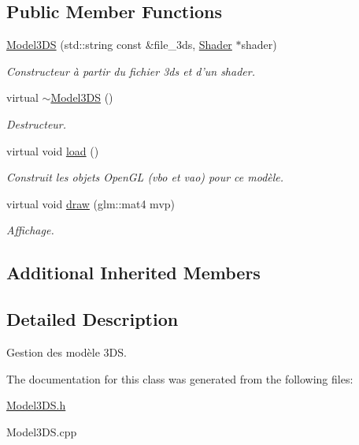 \subsection*{Public Member Functions}
\begin{DoxyCompactItemize}
\item 
\hypertarget{classModel3DS_ad40489eb8948fbc5e838333763ed8729}{\hyperlink{classModel3DS_ad40489eb8948fbc5e838333763ed8729}{Model3\+D\+S} (std\+::string const \&file\+\_\+3ds, \hyperlink{classShader}{Shader} $\ast$shader)}\label{classModel3DS_ad40489eb8948fbc5e838333763ed8729}

\begin{DoxyCompactList}\small\item\em Constructeur à partir du fichier 3ds et d'un shader. \end{DoxyCompactList}\item 
\hypertarget{classModel3DS_a87eb706e70138a70745fa866246f24e0}{virtual \hyperlink{classModel3DS_a87eb706e70138a70745fa866246f24e0}{$\sim$\+Model3\+D\+S} ()}\label{classModel3DS_a87eb706e70138a70745fa866246f24e0}

\begin{DoxyCompactList}\small\item\em Destructeur. \end{DoxyCompactList}\item 
\hypertarget{classModel3DS_ad583f00b00866b9b94a352babdf3944a}{virtual void \hyperlink{classModel3DS_ad583f00b00866b9b94a352babdf3944a}{load} ()}\label{classModel3DS_ad583f00b00866b9b94a352babdf3944a}

\begin{DoxyCompactList}\small\item\em Construit les objets Open\+G\+L (vbo et vao) pour ce modèle. \end{DoxyCompactList}\item 
\hypertarget{classModel3DS_ad9566a257fe27a740ee44b1cedbedcd1}{virtual void \hyperlink{classModel3DS_ad9566a257fe27a740ee44b1cedbedcd1}{draw} (glm\+::mat4 mvp)}\label{classModel3DS_ad9566a257fe27a740ee44b1cedbedcd1}

\begin{DoxyCompactList}\small\item\em Affichage. \end{DoxyCompactList}\end{DoxyCompactItemize}
\subsection*{Additional Inherited Members}


\subsection{Detailed Description}
Gestion des modèle 3\+D\+S. 

The documentation for this class was generated from the following files\+:\begin{DoxyCompactItemize}
\item 
\hyperlink{Model3DS_8h}{Model3\+D\+S.\+h}\item 
Model3\+D\+S.\+cpp\end{DoxyCompactItemize}
